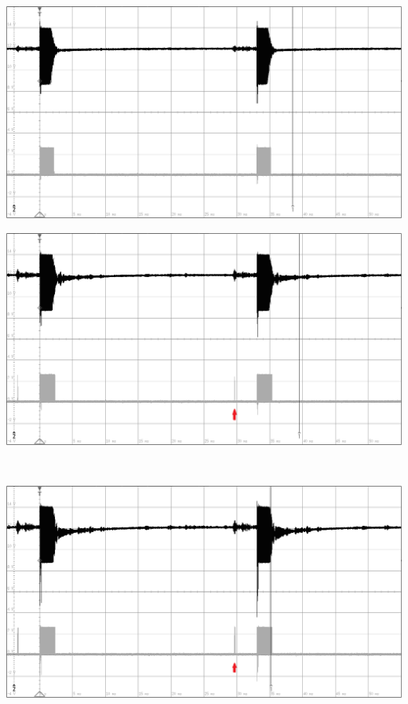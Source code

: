 \begin{minipage}{0.46\textwidth}
\includegraphics[width=1\textwidth%
]{Abbildungen/MessungenP2/5V/5m.PNG}
\label{fig:5v5m2}
\end{minipage}\qquad
\begin{minipage}{0.46\textwidth}
\includegraphics[width=1\textwidth%
]{Abbildungen/MessungenP2/10V/5mb.PNG}
\label{fig:10v5m}
\end{minipage}\\
\begin{minipage}{0.46\textwidth}
\includegraphics[width=1\textwidth%
]{Abbildungen/MessungenP2/15V/5mb.PNG}
\label{fig:15v5m}
\end{minipage}\qquad
